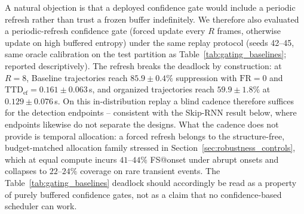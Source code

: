 \documentclass[a4paper,fleqn]{cas-dc}
\begin{document}
{{\color{\revcolor}A natural objection is that a deployed confidence gate would
include a periodic refresh rather than trust a frozen buffer indefinitely. We
therefore also evaluated a periodic-refresh confidence gate (forced update
every $R$ frames, otherwise update on high buffered entropy) under the same
replay protocol (seeds 42--45, same oracle calibration on the test partition
as Table~\ref{tab:gating_baselines}; reported descriptively). The refresh
breaks the deadlock by construction: at $R{=}8$,
Baseline trajectories reach $85.9 \pm 0.4\%$ suppression with
$\mathrm{FR}=0$ and $\mathrm{TTD}_{\mathrm{ef}} = 0.161 \pm 0.063$\,s, and
organized trajectories reach $59.9 \pm 1.8\%$ at $0.129 \pm 0.076$\,s. On
this in-distribution replay a blind cadence therefore suffices for the
detection endpoints -- consistent with the Skip-RNN result below, where
endpoints likewise do not separate the designs. What the cadence does not
provide is temporal allocation: a forced refresh belongs to the
structure-free, budget-matched allocation family stressed in
Section~\ref{sec:robustness_controls}, which at equal compute incurs
$41$--$44\%$ FS@onset under abrupt onsets and collapses to $22$--$24\%$
coverage on rare transient events. The Table~\ref{tab:gating_baselines}
deadlock should accordingly be read as a property of purely buffered
confidence gates, not as a claim that no confidence-based scheduler can
work.}

}
\end{document}
